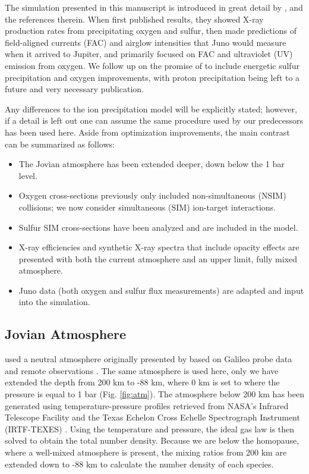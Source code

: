 \documentclass[draft]{agujournal2018}
\begin{document}
The simulation presented in this manuscript is introduced in great detail by \citet{ozak2010,ozak2013,houston2018}, and the references therein.
When \citet{ozak2010} first published results, they showed X-ray production rates from precipitating oxygen and sulfur, then \citet{ozak2013} made predictions of field-aligned currents (FAC) and airglow intensities that Juno would measure when it arrived to Jupiter, and \citet{houston2018} primarily focused on FAC and ultraviolet (UV) emission from oxygen.
We follow up on the promise of \citet{houston2018} to include energetic sulfur precipitation and oxygen improvements, with proton precipitation being left to a future and very necessary publication.

Any differences to the ion precipitation model will be explicitly stated; however, if a detail is left out one can assume the same procedure used by our predecessors has been used here.
Aside from optimization improvements, the main contrast can be summarized as follows:
\begin{itemize}
\item The Jovian atmosphere has been extended deeper, down below the 1 bar level.
\item Oxygen cross-sections previously only included non-simultaneous (NSIM) collisions; we now consider simultaneous (SIM) ion-target interactions.
\item Sulfur SIM cross-sections have been analyzed and are included in the model.
\item X-ray efficiencies and synthetic X-ray spectra that include opacity effects are presented with both the current atmosphere and an upper limit, fully mixed atmosphere.
\item Juno data (both oxygen and sulfur flux measurements) are adapted and input into the simulation.
\end{itemize}

\subsection{Jovian Atmosphere}
\label{sec:atm}

\citet{houston2018} used a neutral atmosphere originally presented by \citet{maurellis2001} based on Galileo probe data \citep{seiff1996,seiff1997} and remote observations \citep{sada1998}.
The same atmosphere is used here, only we have extended the depth from 200 km to -88 km, where 0 km is set to where the pressure is equal to 1 bar (Fig. \ref{fig:atm}).
The atmosphere below 200 km has been generated using temperature-pressure profiles retrieved from NASA's Infrared Telescope Facility and the Texas Echelon Cross Echelle Spectrograph Instrument (IRTF-TEXES) \citep{sinclair2018}.
Using the temperature and pressure, the ideal gas law is then solved to obtain the total number density.
Because we are below the homopause, where a well-mixed atmosphere is present, the mixing ratios from 200 km are extended down to -88 km to calculate the number density of each species.
\end{document}
